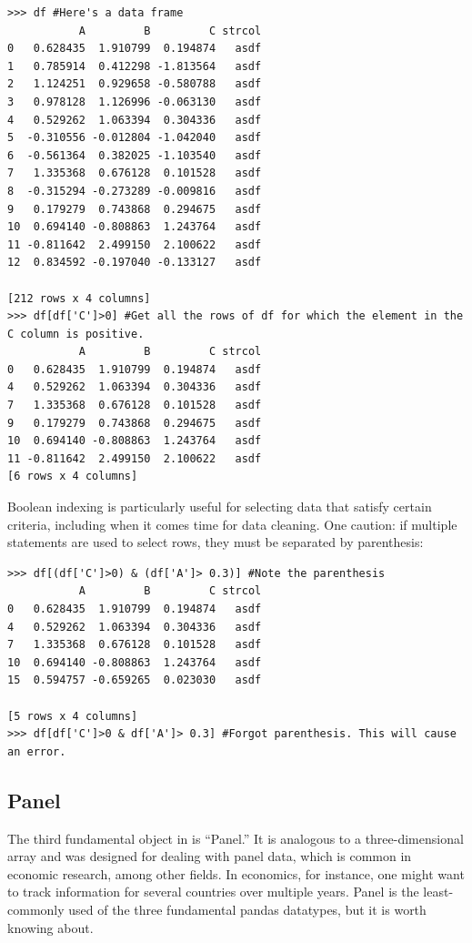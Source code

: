 \begin{lstlisting}
>>> df #Here's a data frame
           A         B         C strcol
0   0.628435  1.910799  0.194874   asdf
1   0.785914  0.412298 -1.813564   asdf
2   1.124251  0.929658 -0.580788   asdf
3   0.978128  1.126996 -0.063130   asdf
4   0.529262  1.063394  0.304336   asdf
5  -0.310556 -0.012804 -1.042040   asdf
6  -0.561364  0.382025 -1.103540   asdf
7   1.335368  0.676128  0.101528   asdf
8  -0.315294 -0.273289 -0.009816   asdf
9   0.179279  0.743868  0.294675   asdf
10  0.694140 -0.808863  1.243764   asdf
11 -0.811642  2.499150  2.100622   asdf
12  0.834592 -0.197040 -0.133127   asdf

[212 rows x 4 columns]
>>> df[df['C']>0] #Get all the rows of df for which the element in the C column is positive.
           A         B         C strcol
0   0.628435  1.910799  0.194874   asdf
4   0.529262  1.063394  0.304336   asdf
7   1.335368  0.676128  0.101528   asdf
9   0.179279  0.743868  0.294675   asdf
10  0.694140 -0.808863  1.243764   asdf
11 -0.811642  2.499150  2.100622   asdf
[6 rows x 4 columns]
\end{lstlisting}

Boolean indexing is particularly useful for selecting data that satisfy certain criteria, including when it comes time for data cleaning. One caution: if multiple statements are used to select rows, they must be separated by parenthesis:

\begin{lstlisting}
>>> df[(df['C']>0) & (df['A']> 0.3)] #Note the parenthesis
           A         B         C strcol
0   0.628435  1.910799  0.194874   asdf
4   0.529262  1.063394  0.304336   asdf
7   1.335368  0.676128  0.101528   asdf
10  0.694140 -0.808863  1.243764   asdf
15  0.594757 -0.659265  0.023030   asdf

[5 rows x 4 columns]
>>> df[df['C']>0 & df['A']> 0.3] #Forgot parenthesis. This will cause an error.
\end{lstlisting}

\subsection*{Panel}



The third fundamental object in  is ``Panel.'' It is analogous to a three-dimensional array and was designed for dealing with panel data, which is common in economic research, among other fields. In economics, for instance, one might want to track information for several countries over multiple years. Panel is the least-commonly used of the three fundamental pandas datatypes, but it is worth knowing about.

